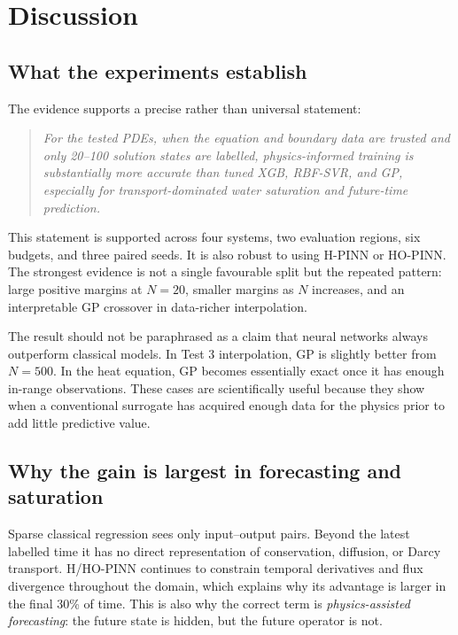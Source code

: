 \section{Discussion}
\label{sec:discussion}

\subsection{What the experiments establish}

The evidence supports a precise rather than universal statement:
\begin{quote}
\emph{For the tested PDEs, when the equation and boundary data are trusted and only 20--100 solution states are labelled, physics-informed training is substantially more accurate than tuned XGB, RBF-SVR, and GP, especially for transport-dominated water saturation and future-time prediction.}
\end{quote}
This statement is supported across four systems, two evaluation regions, six budgets, and three paired seeds. It is also robust to using H-PINN or HO-PINN. The strongest evidence is not a single favourable split but the repeated pattern: large positive margins at \(N=20\), smaller margins as \(N\) increases, and an interpretable GP crossover in data-richer interpolation.

The result should not be paraphrased as a claim that neural networks always outperform classical models. In Test 3 interpolation, GP is slightly better from \(N=500\). In the heat equation, GP becomes essentially exact once it has enough in-range observations. These cases are scientifically useful because they show when a conventional surrogate has acquired enough data for the physics prior to add little predictive value.

\subsection{Why the gain is largest in forecasting and saturation}

Sparse classical regression sees only input--output pairs. Beyond the latest labelled time it has no direct representation of conservation, diffusion, or Darcy transport. H/HO-PINN continues to constrain temporal derivatives and flux divergence throughout the domain, which explains why its advantage is larger in the final 30\% of time. This is also why the correct term is \emph{physics-assisted forecasting}: the future state is hidden, but the future operator is not.

